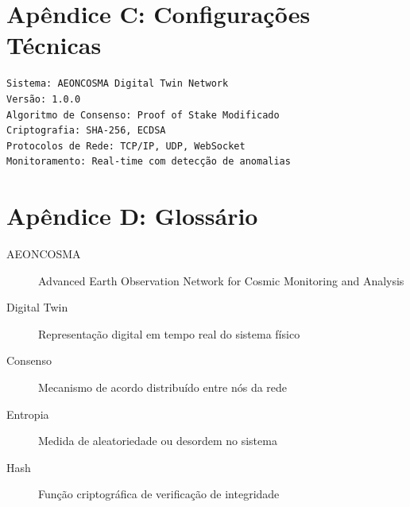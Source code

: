 \documentclass[12pt,a4paper]{report}
\begin{document}
\section{Apêndice C: Configurações Técnicas}


\begin{verbatim}
Sistema: AEONCOSMA Digital Twin Network
Versão: 1.0.0
Algoritmo de Consenso: Proof of Stake Modificado
Criptografia: SHA-256, ECDSA
Protocolos de Rede: TCP/IP, UDP, WebSocket
Monitoramento: Real-time com detecção de anomalias
\end{verbatim}


\section{Apêndice D: Glossário}

\begin{description}
\item[AEONCOSMA] Advanced Earth Observation Network for Cosmic Monitoring and Analysis
\item[Digital Twin] Representação digital em tempo real do sistema físico
\item[Consenso] Mecanismo de acordo distribuído entre nós da rede
\item[Entropia] Medida de aleatoriedade ou desordem no sistema
\item[Hash] Função criptográfica de verificação de integridade
\end{description}
\end{document}
